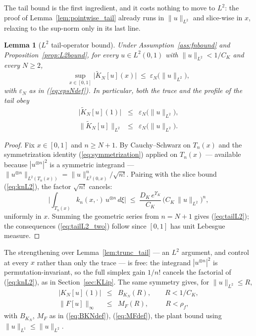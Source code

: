 \documentclass[amsthm]{autart}
\theoremstyle{plain}
\newtheorem{lemma}{Lemma}
\theoremstyle{definition}
\newcommand{\Ltwo}{L^2}
\newcommand{\eps}{\varepsilon}
\begin{document}
The tail bound is the first ingredient, and it costs nothing to move to $\Ltwo$: the proof of Lemma~\ref{lem:pointwise_tail} already runs in $\|u\|_{\Ltwo}$ and slice-wise in $x$, relaxing to the sup-norm only in its last line.

\begin{lemma}[$\Ltwo$ tail-operator bound]\label{lem:tailL2}
Under Assumption~\ref{ass:fnbound} and Proposition~\ref{prop:L2bound}, for every $u \in \Ltwo(0,1)$ with $\|u\|_{\Ltwo} < 1/C_K$ and every $N \ge 2$,
\begin{equation}
\sup_{x \in [0,1]} \bigl|\widetilde K_N[u](x)\bigr| \;\le\; \eps_N\bigl(\|u\|_{\Ltwo}\bigr),
\label{eq:tailL2}
\end{equation}
with $\eps_N$ as in (\ref{eq:epsNdef}). In particular, both the trace and the profile of the tail obey
\begin{eqnarray}
\bigl|\widetilde K_N[u](1)\bigr| &\le& \eps_N\bigl(\|u\|_{\Ltwo}\bigr), \nonumber \\
\bigl\|\widetilde K_N[u]\bigr\|_{\Ltwo} &\le& \eps_N\bigl(\|u\|_{\Ltwo}\bigr).
\label{eq:tailL2_two}
\end{eqnarray}
\end{lemma}

\begin{proof}
Fix $x \in [0,1]$ and $n \ge N+1$. By Cauchy--Schwarz on $T_n(x)$ and the symmetrization identity (\ref{eq:symmetrization}) applied on $T_n(x)$ --- available because $|u^{\otimes n}|^2$ is a symmetric integrand --- $\|u^{\otimes n}\|_{\Ltwo(T_n(x))} = \|u\|_{\Ltwo(0,x)}^n/\sqrt{n!}$. Pairing with the slice bound (\ref{eq:knL2}), the factor $\sqrt{n!}$ cancels:
\begin{equation}
\biggl|\int_{T_n(x)} k_n(x,\cdot)\, u^{\otimes n}\, d\xi\biggr| \;\le\; \frac{D_K\, e^{\Upsilon_K}}{C_K}\,\bigl(C_K\,\|u\|_{\Ltwo}\bigr)^n,
\label{eq:tailL2_pointwise}
\end{equation}
uniformly in $x$. Summing the geometric series from $n = N+1$ gives (\ref{eq:tailL2}); the consequences (\ref{eq:tailL2_two}) follow since $[0,1]$ has unit Lebesgue measure.
\end{proof}

The strengthening over Lemma~\ref{lem:trunc_tail} --- an $\Ltwo$ argument, and control at every $x$ rather than only the trace --- is free: the integrand $|u^{\otimes n}|^2$ is permutation-invariant, so the full simplex gain $1/n!$ cancels the factorial of (\ref{eq:knL2}), as in Section~\ref{sec:KLip}. The same symmetry gives, for $\|u\|_{\Ltwo} \le R$,
\begin{eqnarray}
\bigl|K_N[u](1)\bigr| &\le& B_{K_N}(R), \qquad R < 1/C_K, \nonumber \\
\|F[u]\|_\infty &\le& M_F(R), \qquad\ \ R < \rho_f,
\label{eq:BKN_MF_L2}
\end{eqnarray}
with $B_{K_N}$, $M_F$ as in (\ref{eq:BKNdef}), (\ref{eq:MFdef}), the plant bound using $\|u\|_{L^1} \le \|u\|_{\Ltwo}$.
\end{document}
